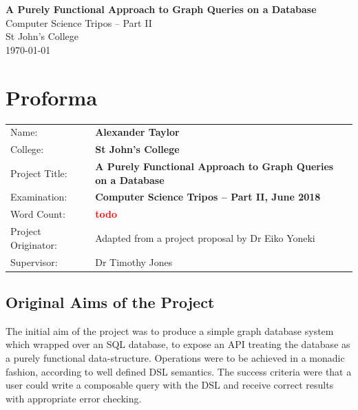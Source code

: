 \documentclass[12pt,a4paper,twoside,openright]{report}
\date{}
\newcommand\todo[1]{\textcolor{red}{#1}}
\newcommand{\projectTitle}[0]{A Purely Functional Approach to Graph Queries on a Database}
\begin{document}


\pagestyle{empty}


\vspace*{60mm}
\begin{center}
\Huge
\textbf{\projectTitle} \\[5mm]
Computer Science Tripos -- Part II \\[5mm]
St John's College \\[5mm]
\today  %
\end{center}


\pagestyle{plain}

\chapter*{Proforma}

{\large
\begin{tabular}{p{5cm}p{10cm}}
Name:               & \bf Alexander Taylor                       \\
College:            & \bf St John's College                     \\
Project Title:      & \bf \projectTitle  \\
Examination:        & \bf Computer Science Tripos -- Part II, June 2018  \\
Word Count:         & \bf \todo{todo}   \\
Project Originator: & Adapted from a project proposal by Dr Eiko Yoneki                    \\
Supervisor:         & Dr Timothy Jones                    \\ 
\end{tabular}
}

\section*{Original Aims of the Project}

The initial aim of the project was to produce a simple graph database system which wrapped over an SQL database, to expose an API treating the database as a purely functional data-structure. Operations were to be achieved in a monadic fashion, according to well defined DSL semantics. The success criteria were that a user could write a composable query with the DSL and receive correct results with appropriate error checking.
\end{document}
